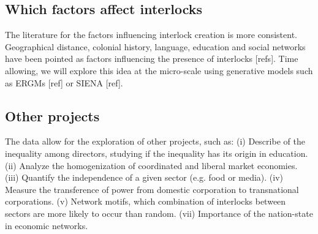 \subsection{Which factors affect interlocks}
\label{sec:factors}
The literature for the factors influencing interlock creation is more consistent.
Geographical distance, colonial history, language, education and social networks have been pointed as factors influencing the presence of interlocks [refs].
Time allowing, we will explore this idea at the micro-scale using generative models such as ERGMs [ref] or SIENA [ref].


\subsection{Other projects}
The data allow for the exploration of other projects, such as:
(i) Describe of the inequality among directors, studying if the inequality has its origin in education.
(ii) Analyze the homogenization of coordinated and liberal market economies.
(iii) Quantify the independence of a given sector (e.g. food or media).
(iv) Measure the transference of power from domestic corporation to transnational corporations.
(v) Network motifs, which combination of interlocks between sectors are more likely to occur than random.
(vii) Importance of the nation-state in economic networks.